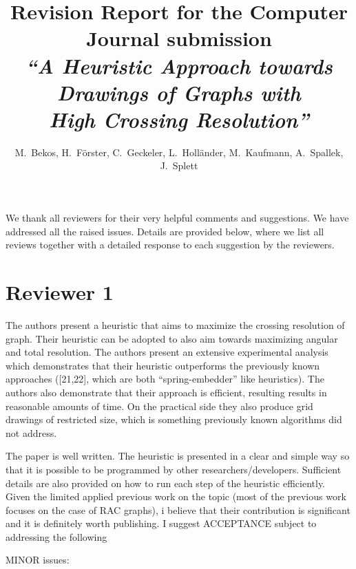 \documentclass{article}
\title{{\normalsize Revision Report for the Computer Journal submission}\\
{\Large\em ``A Heuristic Approach towards Drawings of Graphs with\\High Crossing Resolution''}}
\author{}
\date{}
\author{M.~Bekos, H.~F\"orster, C.~Geckeler, L.~Holl\"ander, M.~Kaufmann, A.~Spallek, J.~Splett}
\begin{document}
\maketitle

\noindent We thank all reviewers for their very helpful comments and suggestions. We have addressed all the raised issues. Details are provided below, where we list all reviews together with a detailed response to each suggestion by the reviewers.

\newpage


\section*{Reviewer 1}

The authors present a heuristic that aims to maximize the crossing resolution of graph. Their heuristic can be adopted to also aim towards maximizing angular and total resolution. The authors present an extensive experimental analysis which demonstrates that their heuristic outperforms the previously known approaches ([21,22], which are both ``spring-embedder'' like heuristics). The authors also demonstrate that their approach is efficient, resulting results in reasonable amounts of time. On the practical side they also produce grid drawings of restricted size, which is something previously known algorithms did not address. 

The paper is well written. The heuristic is presented in a clear and simple way so that it is possible to be programmed by other researchers/developers. Sufficient details are also provided on how to run each step of the heuristic efficiently. Given the limited applied previous work on the topic (most of the previous work focuses on the case of RAC graphs), i believe that their contribution is significant and it is definitely worth publishing. I suggest ACCEPTANCE subject to addressing the following 

MINOR issues:
\end{document}
